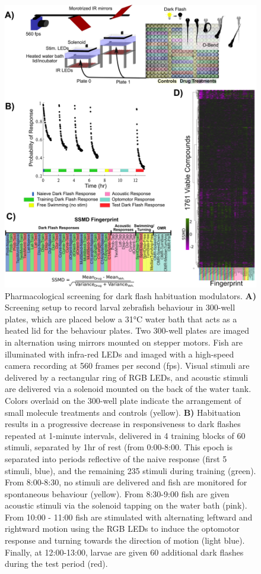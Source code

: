 \documentclass[9pt,lineno]{RandlettLab_elife}
\begin{document}
\begin{figure}
\begin{fullwidth}
\begin{center}

\includegraphics[width=0.8\linewidth]{Figure_1-ScreenSetup}
\caption{Pharmacological screening for dark flash habituation modulators. 
\textbf{A)} Screening setup to record larval zebrafish behaviour in 300-well plates, which are placed below a 31°C water bath that acts as a heated lid for the behaviour plates. Two 300-well plates are imaged in alternation using mirrors mounted on stepper motors. Fish are illuminated with infra-red LEDs and imaged with a high-speed camera recording at 560 frames per second (fps). Visual stimuli are delivered by a rectangular ring of RGB LEDs, and acoustic stimuli are delivered via a solenoid mounted on the back of the water tank. Colors overlaid on the 300-well plate indicate the arrangement of small molecule treatments and controls (yellow). 
\textbf{B)} Habituation results in a progressive decrease in responsiveness to dark flashes repeated at 1-minute intervals, delivered in 4 training blocks of 60 stimuli, separated by 1hr of rest (from 0:00-8:00. This epoch is separated into periods reflective of the naive response (first 5 stimuli, blue), and the remaining 235 stimuli during training (green). From 8:00-8:30, no stimuli are delivered and fish are monitored for spontaneous behaviour (yellow). From 8:30-9:00 fish are given acoustic stimuli via the solenoid tapping on the water bath (pink). From 10:00 - 11:00 fish are stimulated with alternating leftward and rightward motion using the RGB LEDs to induce the optomotor response and turning towards the direction of motion (light blue). Finally, at 12:00-13:00, larvae are given 60 additional dark flashes during the test period (red). 
}
\end{center}
\end{fullwidth}
\end{figure}
\end{document}
